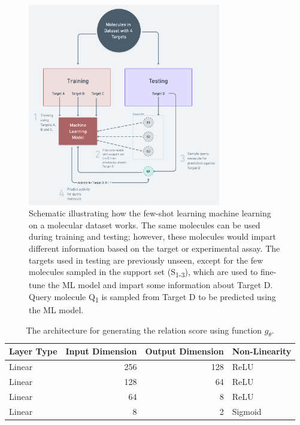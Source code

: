 \begin{figure}[ht!]
    \centering
    \includegraphics[width=0.75\textwidth]{img/Schematic Training.png}
    \caption{Schematic illustrating how the few-shot learning machine learning on a molecular dataset works. The same molecules can be used during training and testing; however, these molecules would impart different information based on the target or experimental assay. The targets used in testing are previously unseen, except for the few molecules sampled in the support set (S\textsubscript{1-3}), which are used to fine-tune the ML model and impart some information about Target D. Query molecule Q\textsubscript{1} is sampled from Target D to be predicted using the ML model.}
    \label{fig:schematic-training}
\end{figure}

\begin{table}[h]
    \centering
    \begin{tabular}{@{}lrrl@{}}
    \hline
    Layer Type & Input Dimension & Output Dimension & Non-Linearity \\
    \hline
    Linear  & 256   & 128   & ReLU \\
    Linear  & 128   & 64    & ReLU \\
    Linear  & 64    & 8     & ReLU \\
    Linear  & 8     & 2     & Sigmoid \\
    \hline
    \end{tabular}
    \caption{The architecture for generating the relation score using function $g_\theta$.}
    \label{table:relation-neural-net}
\end{table}

